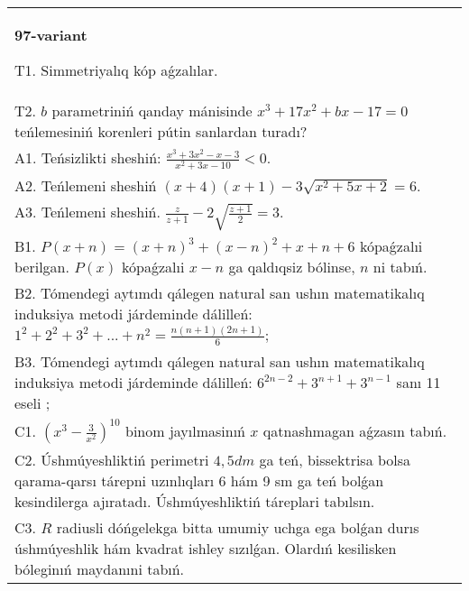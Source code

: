 \documentclass{article}
\begin{document}
\begin{tabular}{m{17cm}}
\textbf{97-variant}
\newline

T1. Simmetriyalıq kóp aǵzalılar. \\
T2. \(b\) parametriniń qanday mánisinde \(x^{3} + 17x^{2} + bx - 17 = 0\) teńlemesiniń korenleri pútin sanlardan turadı? \\
A1. Teńsizlikti sheshiń: \(\frac{x^{3} + 3x^{2} - x - 3}{x^{2} + 3x - 10} < 0\). \\
A2. Teńlemeni sheshiń \((x + 4)(x + 1) - 3\sqrt{x^{2} + 5x + 2} = 6\). \\
A3. Teńlemeni sheshiń. \(\frac{z}{z + 1} - 2\sqrt{\frac{z + 1}{2}} = 3\). \\
B1. \(P(x + n) = (x + n)^{3} + (x - n)^{2} + x + n + 6\) kópaǵzalıi berilgan. \(P(x)\) kópaǵzalıi \(x - n\) ga qaldıqsiz bólinse, \(n\) ni tabıń. \\
B2. Tómendegi aytımdı qálegen natural san ushın matematikalıq induksiya metodi járdeminde dálilleń: \(1^{2} + 2^{2} + 3^{2} + ... + n^{2} = \frac{n(n + 1)(2n + 1)}{6}\); \\
B3. Tómendegi aytımdı qálegen natural san ushın matematikalıq induksiya metodi járdeminde dálilleń: \(6^{2n - 2} + 3^{n + 1} + 3^{n - 1}\) sanı 11 eseli ; \\
C1. \(\left( x^{3} - \frac{3}{x^{2}} \right)^{10}\) binom jayılmasinıń \(x\) qatnashmagan aǵzasın tabıń. \\
C2. Úshmúyeshliktiń perimetri \(4,5dm\) ga teń, bissektrisa bolsa qarama-qarsı tárepni uzınlıqları 6 hám 9 sm ga teń bolǵan kesindilerga ajıratadı. Úshmúyeshliktiń táreplari tabılsın. \\
C3. \(R\) radiusli dóńgelekga bitta umumiy uchga ega bolǵan durıs úshmúyeshlik hám kvadrat ishley sızılǵan. Olardıń kesilisken bóleginıń maydanıni tabıń. \\

\end{tabular}
\vspace{1cm}
\end{document}

